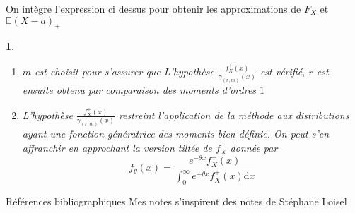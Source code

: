 \documentclass[8pt,notheorems]{beamer}
\newtheorem{remark}{\translate{Remark}}
\theoremstyle{definition}
\theoremstyle{example}
\theoremstyle{mystyle}
\theoremstyle{plain}
\begin{document}
\begin{frame}[allowframebreaks]
$$$$
On intègre l'expression ci dessus pour obtenir les approximations de $F_X$ et $\mathbb{E}(X-a)_+$
\begin{remark}
\begin{enumerate}
    \item $m$ est choisit pour s'assurer que L'hypothèse $\frac{f_X^+(x)}{\gamma_{(r,m)}(x)}$ est vérifié, $r$ est ensuite obtenu par comparaison des moments d'ordres $1$
    \item L'hypothèse $\frac{f_X^+(x)}{\gamma_{(r,m)}(x)}$ restreint l'application de la méthode aux distributions ayant une fonction génératrice des moments bien définie. On peut s'en affranchir en approchant la version tiltée de $f_X^+$ donnée par 
    $$
    f_{\theta}(x)=\frac{e^{-\theta x}f_X^+(x)}{\int_{0}^{\infty}e^{-\theta x}f_X^+(x)\text{d}x}
    $$ 
\end{enumerate}

\end{remark}
\end{frame}
\begin{frame}[allowframebreaks]{Références bibliographiques}
Mes notes s'inspirent des notes de Stéphane Loisel \cite{Lo19}


\end{frame}
\end{document}
